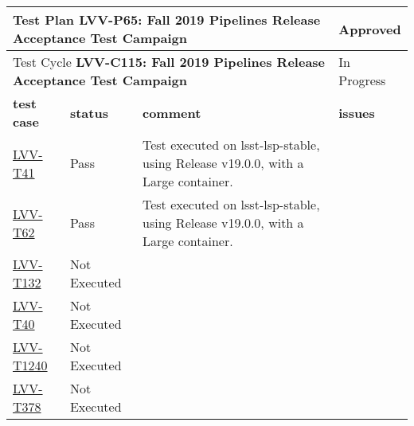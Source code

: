 \documentclass[DM,lsstdraft,STR,toc]{lsstdoc}
\begin{document}
\begin{longtable}{p{2cm}p{2.5cm}p{9cm}p{2.5cm}}
\toprule
\multicolumn{3}{l}{ Test Plan {\bf LVV-P65:  Fall 2019 Pipelines Release Acceptance Test Campaign
 }} & Approved \\\hline

  \multicolumn{3}{l}{ Test Cycle {\bf LVV-C115:  Fall 2019 Pipelines Release Acceptance Test Campaign
 }} & In Progress \\\hline

  {\bf \footnotesize test case} & {\bf \footnotesize status} & {\bf \footnotesize comment} & {\bf \footnotesize issues} \\\toprule

\href{https://jira.lsstcorp.org/secure/Tests.jspa#/testCase/LVV-T41}{LVV-T41}
    & Pass &
    \begin{minipage}[]{9cm}
    \smallskip
     Test executed on lsst-lsp-stable, using Release v19.0.0, with a Large
container.

    \medskip
    \end{minipage}
    &
    \\\hline
\href{https://jira.lsstcorp.org/secure/Tests.jspa#/testCase/LVV-T62}{LVV-T62}
    & Pass &
    \begin{minipage}[]{9cm}
    \smallskip
     Test executed on lsst-lsp-stable, using Release v19.0.0, with a Large
container.

    \medskip
    \end{minipage}
    &
    \\\hline
\href{https://jira.lsstcorp.org/secure/Tests.jspa#/testCase/LVV-T132}{LVV-T132}
    & Not Executed &
    \begin{minipage}[]{9cm}
    \smallskip
    
    \medskip
    \end{minipage}
    &
    \\\hline
\href{https://jira.lsstcorp.org/secure/Tests.jspa#/testCase/LVV-T40}{LVV-T40}
    & Not Executed &
    \begin{minipage}[]{9cm}
    \smallskip
    
    \medskip
    \end{minipage}
    &
    \\\hline
\href{https://jira.lsstcorp.org/secure/Tests.jspa#/testCase/LVV-T1240}{LVV-T1240}
    & Not Executed &
    \begin{minipage}[]{9cm}
    \smallskip
    
    \medskip
    \end{minipage}
    &
    \\\hline
\href{https://jira.lsstcorp.org/secure/Tests.jspa#/testCase/LVV-T378}{LVV-T378}
    & Not Executed &
    \begin{minipage}[]{9cm}
    \smallskip
    

\end{minipage}
\end{longtable}
\end{document}
